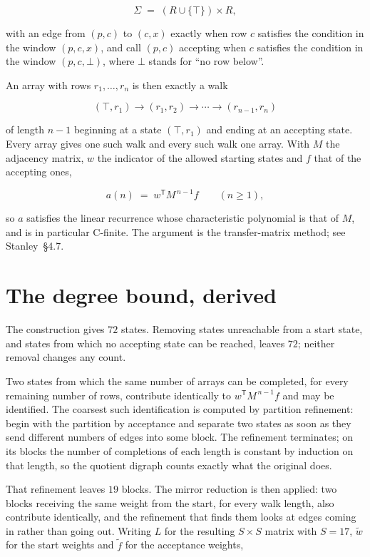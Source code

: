 \documentclass[11pt]{article}
\theoremstyle{definition}
\begin{document}
\[\Sigma \;=\; (R \cup \{\top\}) \times R,\]

with an edge from $(p,c)$ to $(c,x)$ exactly when row $c$ satisfies the condition in the window $(p,c,x)$, and call $(p,c)$ accepting when $c$ satisfies the condition in the window $(p,c,\bot)$, where $\bot$ stands for ``no row below''.

An array with rows $r_1,\dots,r_n$ is then exactly a walk

\[(\top,r_1) \to (r_1,r_2) \to \cdots \to (r_{n-1},r_n)\]

of length $n-1$ beginning at a state $(\top,r_1)$ and ending at an accepting state. Every array gives one such walk and every such walk one array. With $M$ the adjacency matrix, $w$ the indicator of the allowed starting states and $f$ that of the accepting ones,

\[a(n) \;=\; w^{\mathsf T} M^{\,n-1} f \qquad (n \ge 1),\]

so $a$ satisfies the linear recurrence whose characteristic polynomial is that of $M$, and is in particular C-finite. The argument is the transfer-matrix method; see Stanley~\S4.7.

\section{The degree bound, derived}

The construction gives $72$ states. Removing states unreachable from a start state, and states from which no accepting state can be reached, leaves $72$; neither removal changes any count.

Two states from which the same number of arrays can be completed, for every remaining number of rows, contribute identically to $w^{\mathsf T}M^{\,n-1}f$ and may be identified. The coarsest such identification is computed by partition refinement: begin with the partition by acceptance and separate two states as soon as they send different numbers of edges into some block. The refinement terminates; on its blocks the number of completions of each length is constant by induction on that length, so the quotient digraph counts exactly what the original does.

That refinement leaves $19$ blocks. The mirror reduction is then applied: two blocks receiving the same weight from the start, for every walk length, also contribute identically, and the refinement that finds them looks at edges coming in rather than going out. Writing $L$ for the resulting $S \times S$ matrix with $S = 17$, $\tilde w$ for the start weights and $\tilde f$ for the acceptance weights,
\end{document}
